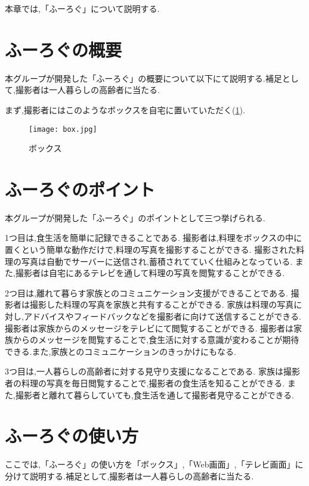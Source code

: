 \documentclass[../report]{subfiles}
\begin{document}
本章では,「ふーろぐ」について説明する.

\section{ふーろぐの概要}
本グループが開発した「ふーろぐ」の概要について以下にて説明する.補足として,撮影者は一人暮らしの高齢者に当たる.

まず,撮影者にはこのようなボックスを自宅に置いていただく(\ref{fig:box}).
\begin{figure}[htbp]
    \begin{center}
        \texttt{[image: box.jpg]}
        \caption{ボックス}
        \label{fig:box}
    \end{center}
\end{figure}

\section{ふーろぐのポイント}
本グループが開発した「ふーろぐ」のポイントとして三つ挙げられる.

1つ目は,食生活を簡単に記録できることである.
撮影者は,料理をボックスの中に置くという簡単な動作だけで,料理の写真を撮影することができる.
撮影された料理の写真は自動でサーバーに送信され,蓄積されてていく仕組みとなっている.
また,撮影者は自宅にあるテレビを通して料理の写真を閲覧することができる.

2つ目は,離れて暮らす家族とのコミュニケーション支援ができることである.
撮影者は撮影した料理の写真を家族と共有することができる.
家族は料理の写真に対し,アドバイスやフィードバックなどを撮影者に向けて送信することができる.
撮影者は家族からのメッセージをテレビにて閲覧することができる.
撮影者は家族からのメッセージを閲覧することで,食生活に対する意識が変わることが期待できる.また,家族とのコミュニケーションのきっかけにもなる.

3つ目は,一人暮らしの高齢者に対する見守り支援になることである.
家族は撮影者の料理の写真を毎日閲覧することで,撮影者の食生活を知ることができる.
また,撮影者と離れて暮らしていても,食生活を通して撮影者見守ることができる.

\section{ふーろぐの使い方}
ここでは,「ふーろぐ」の使い方を「ボックス」,「Web画面」,「テレビ画面」に分けて説明する.補足として,撮影者は一人暮らしの高齢者に当たる.
\end{document}
